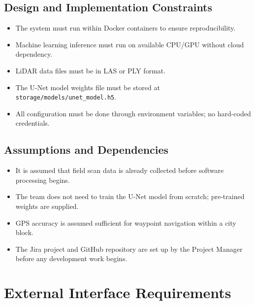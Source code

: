 \documentclass{article}
\begin{document}
\subsection{Design and Implementation Constraints}
\begin{itemize}
  \item The system must run within Docker containers to ensure reproducibility.
  \item Machine learning inference must run on available CPU/GPU without cloud dependency.
  \item LiDAR data files must be in LAS or PLY format.
  \item The U-Net model weights file must be stored at \texttt{storage/models/unet\_model.h5}.
  \item All configuration must be done through environment variables; no hard-coded credentials.
\end{itemize}

\subsection{Assumptions and Dependencies}
\begin{itemize}
  \item It is assumed that field scan data is already collected before software processing begins.
  \item The team does not need to train the U-Net model from scratch; pre-trained weights are
    supplied.
  \item GPS accuracy is assumed sufficient for waypoint navigation within a city block.
  \item The Jira project and GitHub repository are set up by the Project Manager before any
    development work begins.
\end{itemize}

\section{External Interface Requirements}
\label{sec:interfaces}
\end{document}
